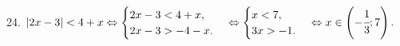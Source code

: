 24. $|2x-3|<4+x\Leftrightarrow\begin{cases}2x-3<4+x,\\ 2x-3>-4-x.\end{cases}
\Leftrightarrow\begin{cases}x<7,\\ 3x>-1.\end{cases}\Leftrightarrow
x\in\left(-\cfrac{1}{3};7\right).$\\
